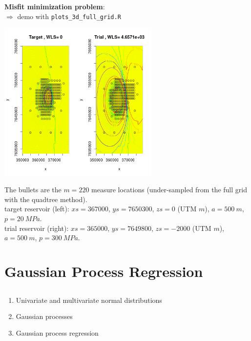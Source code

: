 \begin{frame}{}
\textbf{Misfit minimization problem}: \\
$\Rightarrow$ demo with \texttt{plots\_3d\_full\_grid.R}
\begin{center}
\includegraphics[width=0.6\textwidth,height=0.6\textheight]{1_stat_models/figures/contour_ulos_compare}
\end{center}
{\tiny The bullets are the $m=220$ measure locations (under-sampled from the full grid with the quadtree method). \\ 
target reservoir (left): $xs= 367000$, $ys= 7650300$, $zs=0$ (UTM $m$), $a=500~m$, $p=20~MPa$.\\
trial reservoir (right): $xs= 365000$, $ys= 7649800$, $zs=-2000$ (UTM $m$), $a=500~m$, $p=300~MPa$.\\
}
\end{frame}

\section[Gaussian Process regression]{Gaussian Process Regression}
\subsection{}
\begin{frame}{}
\vspace{0.75cm}
\vspace{0.5cm}
\begin{enumerate}
    \item Univariate and multivariate normal distributions
    \item Gaussian processes
    \item Gaussian process regression
\end{enumerate}
\end{frame}

